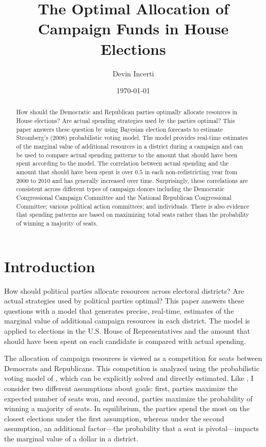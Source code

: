 \documentclass[12pt,final,fleqn]{article}
\theoremstyle{plain}
\begin{document}
\author{Devin Incerti}
\title{\textbf{The Optimal Allocation of Campaign Funds in House Elections}}
\date{\today}
\maketitle

\thispagestyle{empty}
\setcounter{page}{0}

\begin{singlespacing}
\begin{abstract}
How should the Democratic and Republican parties optimally allocate resources in House elections? Are actual spending strategies used by the parties optimal? This paper answers these question by using Bayesian election forecasts to estimate Stromberg's (2008) probabilistic voting model. The model provides real-time estimates of the marginal value of additional resources in a district during a campaign and can be used to compare actual spending patterns to the amount that should have been spent according to the model. The correlation between actual spending and the amount that should have been spent is over $0.5$ in each non-redistricting year from 2000 to 2010 and has generally increased over time.  Surprisingly, these correlations are consistent across different types of campaign donors including the Democratic Congressional Campaign Committee and the National Republican Congressional Committee; various political action committees; and individuals. There is also evidence that spending patterns are based on maximizing total seats rather than the probability of winning a majority of seats.
\end{abstract}
\end{singlespacing}

\clearpage
\doublespacing

\section{Introduction}
How should political parties allocate resources across electoral districts? Are actual strategies used by political parties optimal? This paper answers these questions with a model that generates precise, real-time, estimates of the marginal value of additional campaign resources in each district. The model is applied to elections in the U.S. House of Representatives and the amount that should have been spent on each candidate is compared with actual spending. 

The allocation of campaign resources is viewed as a competition for seats between Democrats and Republicans. This competition is analyzed using the probabilistic voting model of \citet{stromberg2008electoral}, which can be explicitly solved and directly estimated. Like \citet{snyder1989election}, I consider two different assumptions about goals: first, parties maximize the expected number of seats won, and second, parties maximize the probability of winning a majority of seats. In equilibrium, the parties spend the most on the closest elections under the first assumption, whereas under the second assumption, an additional factor---the probability that a seat is pivotal---impacts the marginal value of a dollar in a district.
\end{document}
